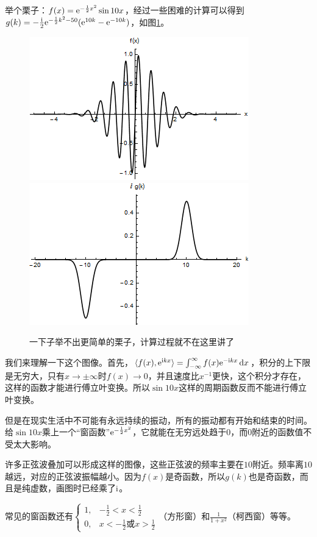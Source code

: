 举个栗子：$f(x)=\mathrm{e}^{-\frac{1}{2} x^2} \sin 10 x$，经过一些困难的计算可以得到$g(k)=-\frac{\mathrm{i}}{2} \mathrm{e}^{-\frac{1}{2} k^2-50}(\mathrm{e}^{10 k}-\mathrm{e}^{-10 k})$，如图\ref{fig-gauss-sin10x}。
\begin{figure}[htb]
\centering
\includegraphics[width=0.33\linewidth]{fig/gauss-sin10x.png}
\includegraphics[width=0.33\linewidth]{fig/gauss-sin10x-g.png}
\caption{一下子举不出更简单的栗子，计算过程就不在这里讲了}
\label{fig-gauss-sin10x}
\end{figure}

我们来理解一下这个图像。首先，$\langle f(x),\mathrm{e}^{\mathrm{i} k x} \rangle=\int_{-\infty}^{\infty} f(x) \mathrm{e}^{-\mathrm{i} k x} \mathop{}\!\mathrm{d} x$，积分的上下限是无穷大，只有$x \rightarrow \pm \infty$时$f(x) \rightarrow 0$，并且速度比$x^{-1}$更快，这个积分才存在，这样的函数才能进行傅立叶变换。所以$\sin 10 x$这样的周期函数反而不能进行傅立叶变换。

但是在现实生活中不可能有永远持续的振动，所有的振动都有开始和结束的时间。给$\sin 10 x$乘上一个“窗函数”$\mathrm{e}^{-\frac{1}{2} x^2}$，它就能在无穷远处趋于$0$，而$0$附近的函数值不受太大影响。

许多正弦波叠加可以形成这样的图像，这些正弦波的频率主要在$10$附近。频率离$10$越远，对应的正弦波振幅越小。因为$f(x)$是奇函数，所以$g(k)$也是奇函数，而且是纯虚数，画图时已经乘了$\mathrm{i}$。

常见的窗函数还有$\begin{cases} 1, &-\frac{1}{2}<x<\frac{1}{2} \\ 0, &x<-\frac{1}{2} \text{或} x>\frac{1}{2} \end{cases}$（方形窗）和$\frac{1}{1+x^2}$（柯西窗）等等。

